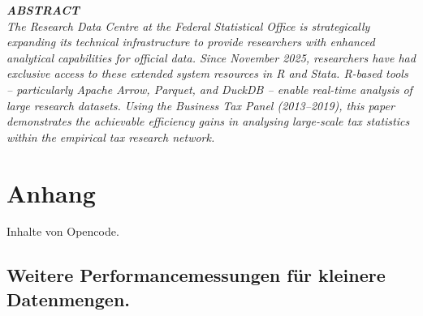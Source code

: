 \documentclass[
  german,
  10pt,
  twoside]{article}
\renewcommand*\contentsname{Inhaltsverzeichnis}
\newcommand\contentsname{Inhaltsverzeichnis}
\begin{document}
\begin{titlepage}
\begin{minipage}[t]{11.8cm}
\vspace{0.3cm}

{\itshape\color{wistaDarkGray}\bfseries\MakeUppercase{Abstract}}\\[0.15cm]
\small\itshape
The Research Data Centre at the Federal Statistical Office is strategically expanding its technical infrastructure to provide researchers with enhanced analytical capabilities for official data. Since November 2025, researchers have had exclusive access to these extended system resources in R and Stata. R-based tools -- particularly Apache Arrow, Parquet, and DuckDB -- enable real-time analysis of large research datasets. Using the Business Tax Panel (2013--2019), this paper demonstrates the achievable efficiency gains in analysing large-scale tax statistics within the empirical tax research network.

\end{minipage}

\vfill

\vspace{0.5cm}
\noindent{}

\end{titlepage}

\pagestyle{fancy}

\renewcommand*\contentsname{Inhaltsverzeichnis}
{
\hypersetup{linkcolor=}
\setcounter{tocdepth}{3}
\tableofcontents
}

\section*{Anhang}\label{anhang}

Inhalte von Opencode.

\subsection*{Weitere Performancemessungen für kleinere
Datenmengen.}\label{weitere-performancemessungen-fuxfcr-kleinere-datenmengen.}
\end{document}
